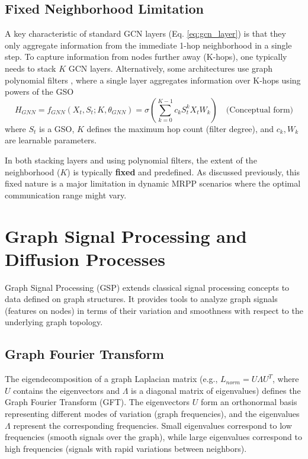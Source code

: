 \subsection{Fixed Neighborhood Limitation}
A key characteristic of standard GCN layers (Eq. \ref{eq:gcn_layer}) is that they only aggregate information from the immediate 1-hop neighborhood in a single step. To capture information from nodes further away (K-hops), one typically needs to stack $K$ GCN layers. Alternatively, some architectures use graph polynomial filters \cite{Defferrard2016ChebNet}, where a single layer aggregates information over K-hops using powers of the GSO 
\begin{equation}
    H_{GNN} = f_{GNN}(X_t, S_t; K, \theta_{GNN}) = \sigma \left( \sum_{k=0}^{K-1} c_k S_t^k X_t W_k \right) \quad \text{(Conceptual form)}
\end{equation}
where $S_t$ is a GSO, $K$ defines the maximum hop count (filter degree), and $c_k, W_k$ are learnable parameters.

In both stacking layers and using polynomial filters, the extent of the neighborhood ($K$) is typically \textbf{fixed} and predefined. As discussed previously, this fixed nature is a major limitation in dynamic MRPP scenarios where the optimal communication range might vary.

\section{Graph Signal Processing and Diffusion Processes}
\label{sec:gsp_diffusion}

Graph Signal Processing (GSP) extends classical signal processing concepts to data defined on graph structures. It provides tools to analyze graph signals (features on nodes) in terms of their variation and smoothness with respect to the underlying graph topology.

\subsection{Graph Fourier Transform}
The eigendecomposition of a graph Laplacian matrix (e.g., $L_{norm} = U \Lambda U^T$, where $U$ contains the eigenvectors and $\Lambda$ is a diagonal matrix of eigenvalues) defines the Graph Fourier Transform (GFT). The eigenvectors $U$ form an orthonormal basis representing different modes of variation (graph frequencies), and the eigenvalues $\Lambda$ represent the corresponding frequencies. Small eigenvalues correspond to low frequencies (smooth signals over the graph), while large eigenvalues correspond to high frequencies (signals with rapid variations between neighbors).

